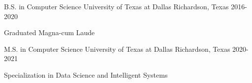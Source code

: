 


\begin{cventries}


\cventry
{B.S. in Computer Science} %
{University of Texas at Dallas} %
{Richardson, Texas} %
{2016-2020} %
{
\begin{cvitems} %
    \item {Graduated Magna-cum Laude}
\end{cvitems}
}


\cventry
{M.S. in Computer Science} %
{University of Texas at Dallas} %
{Richardson, Texas} %
{2020-2021} %
{
\begin{cvitems} %
    \item {Specialization in Data Science and Intelligent Systems}
\end{cvitems}
}


\end{cventries}